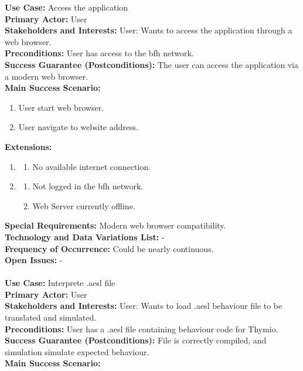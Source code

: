 \documentclass{scrbook}
\begin{document}
\textbf{Use Case: }Access the application \\
\textbf{Primary Actor: }User \\
\textbf{Stakeholders and Interests: }User: Wants to access the application through a web browser. \\
\textbf{Preconditions: }User has access to the bfh network. \\
\textbf{Success Guarantee (Postconditions): }The user can access the application via a modern web browser. \\
\textbf{Main Success Scenario: } 
\begin{enumerate}
  \item User start web browser.
  \item User navigate to website address.
\end{enumerate}
\textbf{Extensions: } 
\begin{enumerate}
  \item 
  \begin{enumerate}
    \item No available internet connection.
  \end{enumerate}
  \item 
  \begin{enumerate}
    \item Not logged in the bfh network.
    \item Web Server currently offline.
  \end{enumerate}
\end{enumerate}
\textbf{Special Requirements: }Modern web browser compatibility. \\
\textbf{Technology and Data Variations List: }- \\
\textbf{Frequency of Occurrence: }Could be nearly continuous.\\
\textbf{Open Issues: }- \\
\\
\textbf{Use Case: }Interprete .aesl file \\
\textbf{Primary Actor: }User \\
\textbf{Stakeholders and Interests: }User: Wants to load .aesl behaviour file to be translated and simulated. \\
\textbf{Preconditions: }User has a .aesl file containing behaviour code for Thymio. \\
\textbf{Success Guarantee (Postconditions): }File is correctly compiled, and simulation simulate expected behaviour. \\
\textbf{Main Success Scenario: }
\end{document}
